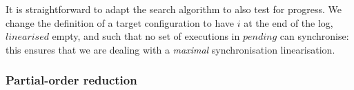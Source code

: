 

It is straightforward to adapt the search algorithm to also test for progress.
We change the definition of a target configuration to have $i$ at the end of
the log, $linearised$ empty, and such that no set of executions in $pending$
can synchronise: this ensures that we are dealing with a \emph{maximal}
synchronisation linearisation.  


\subsubsection{Partial-order reduction}

